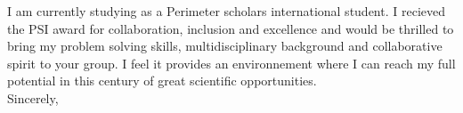 \documentclass[12pt]{article}
\begin{document}
I am currently studying as a Perimeter scholars international student. I recieved the PSI award for collaboration, inclusion and excellence and would be thrilled to bring my problem solving skills, multidisciplinary background and collaborative spirit to your group. I feel it provides an environnement where I can reach my full potential in this century of great scientific opportunities.\\


Sincerely,


%



\end{document}
